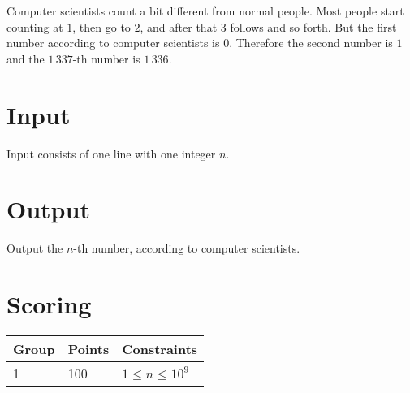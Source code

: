 
Computer scientists count a bit different from normal people.
Most people start counting at $1$, then go to $2$, and after that $3$ follows and so forth.
But the first number according to computer scientists is $0$.
Therefore the second number is $1$ and the $1\,337$-th number is $1\,336$.

\section*{Input}
Input consists of one line with one integer $n$.

\section*{Output}
Output the $n$-th number, according to computer scientists.

\section*{Scoring}
\begin{tabular}{|l|l|l|}
\hline
Group & Points & Constraints \\ \hline
1     & 100  & $1 \leq n \leq 10^9$ \\ \hline
\end{tabular}
